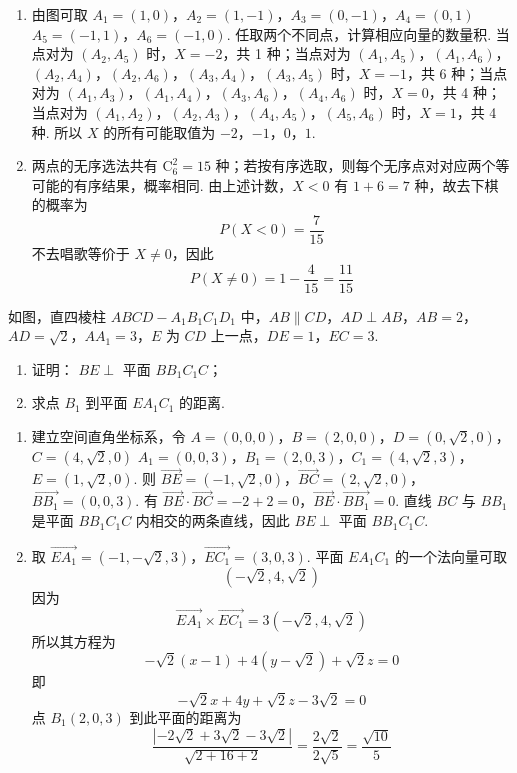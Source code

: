 \begin{solution}
\begin{enumerate}
\item 由图可取
\(A_1=(1,0)\)，\(A_2=(1,-1)\)，\(A_3=(0,-1)\)，\(A_4=(0,1)\)
\(A_5=(-1,1)\)，\(A_6=(-1,0)\).
任取两个不同点，计算相应向量的数量积. 当点对为 \((A_2,A_5)\) 时，\(X=-2\)，共 1 种；当点对为 \((A_1,A_5)\)，\((A_1,A_6)\)，\((A_2,A_4)\)，\((A_2,A_6)\)，\((A_3,A_4)\)，\((A_3,A_5)\) 时，\(X=-1\)，共 6 种；当点对为 \((A_1,A_3)\)，\((A_1,A_4)\)，\((A_3,A_6)\)，\((A_4,A_6)\) 时，\(X=0\)，共 4 种；当点对为 \((A_1,A_2)\)，\((A_2,A_3)\)，\((A_4,A_5)\)，\((A_5,A_6)\) 时，\(X=1\)，共 4 种.
所以 \(X\) 的所有可能取值为 \(-2\)，\(-1\)，\(0\)，\(1\).
\item 两点的无序选法共有 \(\mathrm C_6^2=15\) 种；若按有序选取，则每个无序点对对应两个等可能的有序结果，概率相同. 由上述计数，\(X<0\) 有 \(1+6=7\) 种，故去下棋的概率为
\[
P(X<0)=\frac7{15}
\]
不去唱歌等价于 \(X\ne0\)，因此
\[
P(X\ne0)=1-\frac4{15}=\frac{11}{15}
\]
\end{enumerate}
\end{solution}

\begin{problem}
如图，直四棱柱 \(ABCD - A_{1}B_{1}C_{1}D_{1}\) 中，\(AB \parallel CD\)，\(AD \perp AB\)，\(AB = 2\)，\(AD = \sqrt{2}\)，\(AA_{1} = 3\)，\(E\) 为 \(CD\) 上一点，\(DE = 1\)，\(EC = 3\).
\begin{enumerate}
\item 证明： \(BE \perp\) 平面 \(BB_{1}C_{1}C\)；
\item 求点 \(B_{1}\) 到平面 \(EA_{1}C_{1}\) 的距离.
\end{enumerate}
\end{problem}

\begin{solution}
\begin{enumerate}
\item 建立空间直角坐标系，令
\(A=(0,0,0)\)，\(B=(2,0,0)\)，\(D=(0,\sqrt2,0)\)，\(C=(4,\sqrt2,0)\)
\(A_1=(0,0,3)\)，\(B_1=(2,0,3)\)，\(C_1=(4,\sqrt2,3)\)，\(E=(1,\sqrt2,0)\).
则
\(\overrightarrow{BE}=(-1,\sqrt2,0)\)，\(\overrightarrow{BC}=(2,\sqrt2,0)\)，\(\overrightarrow{BB_1}=(0,0,3)\).
有
\(\overrightarrow{BE}\cdot\overrightarrow{BC}=-2+2=0\)，\(\overrightarrow{BE}\cdot\overrightarrow{BB_1}=0\).
直线 \(BC\) 与 \(BB_1\) 是平面 \(BB_1C_1C\) 内相交的两条直线，因此 \(BE\perp\) 平面 \(BB_1C_1C\).
\item 取
\(\overrightarrow{EA_1}=(-1,-\sqrt2,3)\)，\(\overrightarrow{EC_1}=(3,0,3)\).
平面 \(EA_1C_1\) 的一个法向量可取
\[
(-\sqrt2,4,\sqrt2)
\]
因为
\[
\overrightarrow{EA_1}\times\overrightarrow{EC_1}=3(-\sqrt2,4,\sqrt2)
\]
所以其方程为
\[
-\sqrt2(x-1)+4(y-\sqrt2)+\sqrt2z=0
\]
即
\[
-\sqrt2x+4y+\sqrt2z-3\sqrt2=0
\]
点 \(B_1(2,0,3)\) 到此平面的距离为
\[
\frac{|-2\sqrt2+3\sqrt2-3\sqrt2|}{\sqrt{2+16+2}}
 =\frac{2\sqrt2}{2\sqrt5}=\frac{\sqrt{10}}5
\]
\end{enumerate}
\end{solution}

